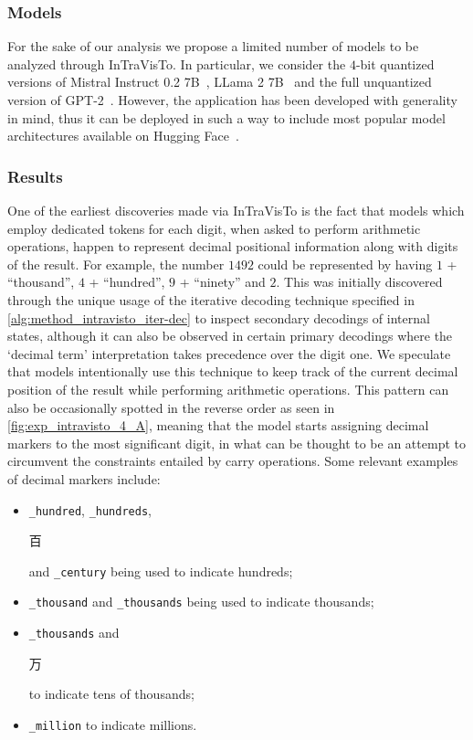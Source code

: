 \subsubsection{Models}

For the sake of our analysis we propose a limited number of models to be analyzed through InTraVisTo.
In particular, we consider the $4$-bit quantized versions of Mistral Instruct 0.2 7B~\cite{jiang2023}, LLama 2 7B~\cite{touvron2023} and the full unquantized version of GPT-2~\cite{radford2019}.
However, the application has been developed with generality in mind, thus it can be deployed in such a way to include most popular model architectures available on Hugging Face~\cite{wolf2020}.


\subsubsection{Results}

One of the earliest discoveries made via InTraVisTo is the fact that models which employ dedicated tokens for each digit, when asked to perform arithmetic operations, happen to represent decimal positional information along with digits of the result.
For example, the number $1492$ could be represented by having $1$ + ``thousand'', $4$ + ``hundred'', $9$ + ``ninety'' and $2$.
This was initially discovered through the unique usage of the iterative decoding technique specified in \cref{alg:method_intravisto_iter-dec} to inspect secondary decodings of internal states, although it can also be observed in certain primary decodings where the `decimal term' interpretation takes precedence over the digit one.
We speculate that models intentionally use this technique to keep track of the current decimal position of the result while performing arithmetic operations.
This pattern can also be occasionally spotted in the reverse order as seen in \cref{fig:exp_intravisto_4_A}, meaning that the model starts assigning decimal markers to the most significant digit, in what can be thought to be an attempt to circumvent the constraints entailed by carry operations.
Some relevant examples of decimal markers include:
\begin{itemize}
    \item \texttt{\_hundred}, \texttt{\_hundreds}, \begin{CJK}{UTF8}{goth}百\end{CJK} and \texttt{\_century} being used to indicate hundreds;
    \item \texttt{\_thousand} and \texttt{\_thousands} being used to indicate thousands;
    \item \texttt{\_thousands} and \begin{CJK}{UTF8}{goth}万\end{CJK} to indicate tens of thousands;
    \item \texttt{\_million} to indicate millions.
\end{itemize}

